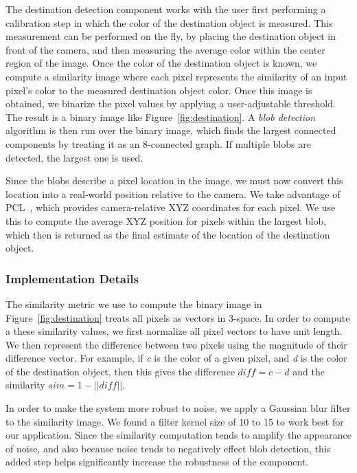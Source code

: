 The destination detection component works with the user first performing a
calibration step in which the color of the destination object is measured.
This measurement can be performed on the fly, by placing the
destination object in front of the camera, and then measuring the average 
color within the center region of the image. Once the color of the destination
object is known, we compute a similarity image where each pixel represents the 
similarity of an input pixel's color to the measured destination object color. Once 
this image is obtained, we binarize the pixel values by applying a 
user-adjustable threshold. The result is a binary image like
Figure~\ref{fig:destination}. A \emph{blob detection} algorithm is then run over the 
binary image, which finds the largest connected components by treating it as an 
8-connected graph. If multiple blobs are detected, the largest one is used.

Since the blobs describe a pixel location in the image, we must now convert 
this location into a real-world position relative to the camera. We take
advantage of PCL~\cite{pcl-website}, which provides camera-relative XYZ coordinates
for each pixel. We use this to compute the average XYZ position for pixels
within the largest blob, which then is returned as the final estimate of the location
of the destination object. 


\subsubsection{Implementation Details}
\label{sec:technical-dest-impl}

The similarity metric we use to compute the binary image in Figure~\ref{fig:destination}
treats all pixels as vectors in 3-space. In order
to compute a these similarity values, we first normalize all pixel vectors
to have unit length. We then represent the difference between two pixels using the
magnitude of their difference vector. For example, if \emph{c} is the color of a
given pixel, and \emph{d} is the color of the destination object, then this gives the 
difference \begin{math} \textit{diff} = c - d \end{math} and the similarity 
\begin{math}\textit{sim} = 1 - ||\textit{diff}|| \end{math}.

In order to make the system more robust to noise, we apply a Gaussian blur
filter to the similarity image. We found a filter kernel size of 10 to 15 to work 
best for our application. Since the similarity computation tends
to amplify the appearance of noise, and also because noise tends to
negatively effect blob detection, this added step helps significantly increase
the robustness of the component.

